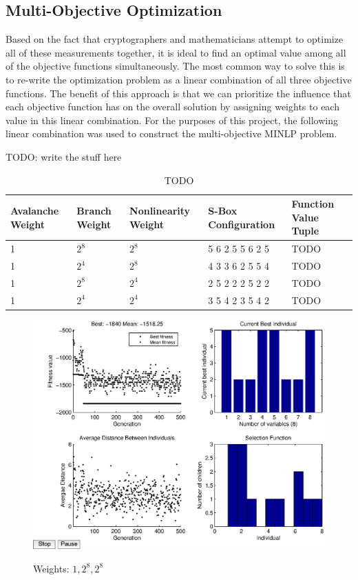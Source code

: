 \documentclass[11pt]{article}
\begin{document}
\subsection{Multi-Objective Optimization}
Based on the fact that cryptographers and mathematicians attempt to optimize all of these measurements together, it is ideal to find an optimal value among all of the objective functions simultaneously. The most common way to solve this is to re-write the optimization problem as a linear combination of all three objective functions. The benefit of this approach is that we can prioritize the influence that each objective function has on the overall solution by assigning weights to each value in this linear combination. For the purposes of this project, the following linear combination was used to construct the multi-objective MINLP problem.

TODO: write the stuff here

\begin{table}
	\centering
	\caption{TODO}
	\label{jointTable}
    \begin{tabular}{|l|l|l|l|l|}
        \hline
        Avalanche Weight & Branch Weight & Nonlinearity Weight & S-Box Configuration & Function Value Tuple\\ \hline
        1 & $2^8$ & $2^8$ & 5     6     2     5     5     6     2     5 & TODO \\ 
        1 & $2^4$ & $2^8$ & 4     3     3     6     2     5     5     4 & TODO \\ 
        1 & $2^8$ & $2^4$ & 2     5     2     2     2     5     2     2 & TODO \\ 
        1 & $2^4$ & $2^4$ & 3     5     4     2     3     5     4     2 & TODO \\ 
        \hline
    \end{tabular}
\end{table}

\begin{figure}
	\centering
	\includegraphics[scale=0.5]{images/joint8.eps} \\
	\label{joint8}
\caption{Weights: $1, 2^8, 2^8$}
\end{figure}
\end{document}
